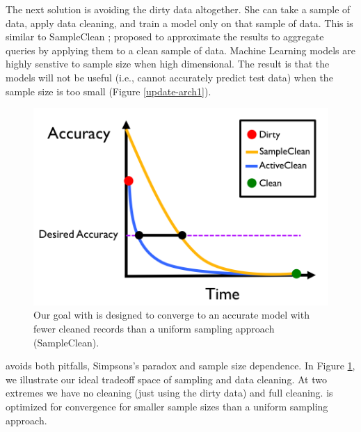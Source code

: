 The next solution is avoiding the dirty data altogether.
She can take a sample of data, apply data cleaning, and train a model only on that sample of data.
This is similar to SampleClean \cite{wang1999sample}; proposed to approximate the results to aggregate queries by applying them to a clean sample of data.
Machine Learning models are highly senstive to sample size when high dimensional.
The result is that the models will not be useful (i.e., cannot accurately predict test data) when the sample size is too small (Figure \ref{update-arch1}).

\begin{figure}[t]
\centering
 \includegraphics[width=0.6\columnwidth]{figs/arch2.png}
 \caption{Our goal with \sys is designed to converge to an accurate model with fewer cleaned records than a uniform sampling approach (SampleClean). \label{sys-arch2}}
\end{figure}

\sys avoids both pitfalls, Simpsons's paradox and sample size dependence.
In Figure \ref{sys-arch2}, we illustrate our ideal tradeoff space of sampling and data cleaning.
At two extremes we have no cleaning (just using the dirty data) and full cleaning.
\sys is optimized for convergence for smaller sample sizes than a uniform sampling approach.

